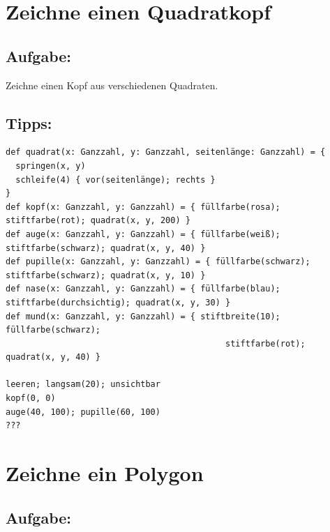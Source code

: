 \chapter{Zeichne einen Quadratkopf}\section*{\color{BrickRed}Aufgabe:}
Zeichne einen Kopf aus verschiedenen Quadraten.
\\


  
\section*{\color{OliveGreen}Tipps:}

\begin{lstlisting}[basicstyle={\ttfamily\fontsize{14}{17}\selectfont},numbers=none]
def quadrat(x: Ganzzahl, y: Ganzzahl, seitenlänge: Ganzzahl) = {
  springen(x, y)
  schleife(4) { vor(seitenlänge); rechts }
}
def kopf(x: Ganzzahl, y: Ganzzahl) = { füllfarbe(rosa); stiftfarbe(rot); quadrat(x, y, 200) }
def auge(x: Ganzzahl, y: Ganzzahl) = { füllfarbe(weiß); stiftfarbe(schwarz); quadrat(x, y, 40) }
def pupille(x: Ganzzahl, y: Ganzzahl) = { füllfarbe(schwarz); stiftfarbe(schwarz); quadrat(x, y, 10) }
def nase(x: Ganzzahl, y: Ganzzahl) = { füllfarbe(blau); stiftfarbe(durchsichtig); quadrat(x, y, 30) }
def mund(x: Ganzzahl, y: Ganzzahl) = { stiftbreite(10); füllfarbe(schwarz); 
                                            stiftfarbe(rot); quadrat(x, y, 40) }

leeren; langsam(20); unsichtbar
kopf(0, 0)
auge(40, 100); pupille(60, 100)
???
\end{lstlisting}
        
\chapter{Zeichne ein Polygon}\section*{\color{BrickRed}Aufgabe:}


